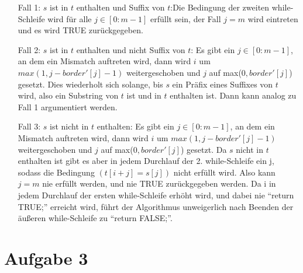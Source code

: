 \documentclass[a4paper,10pt,oneside,leqno]{scrartcl}
\begin{document}
\begin{itemize}
  \item[Fall 1:] $s$ ist in $t$ enthalten und Suffix von $t$:\newline Die Bedingung der zweiten while-Schleife wird für alle $j\in [0:m-1]$ erfüllt sein,
  der Fall $j=m$ wird eintreten und es wird TRUE zurückgegeben.
  \item[Fall 2:] $s$ ist in $t$ enthalten und nicht Suffix von $t$: Es gibt ein $j\in [0:m-1]$, an dem ein Mismatch auftreten wird, dann wird $i$ um
  $max(1,j-border'[j]-1)$ weitergeschoben und $j$ auf max($0,border'[j]$) gesetzt. Dies wiederholt sich solange, bis $s$ ein Präfix eines Suffixes von $t$ wird,
  also ein Substring von $t$ ist und in $t$ enthalten ist. Dann kann analog zu Fall 1 argumentiert werden.
  \item[Fall 3:] $s$ ist nicht in $t$ enthalten: Es gibt ein $j\in [0:m-1]$, an dem ein Mismatch auftreten wird, dann wird $i$ um
  $max(1,j-border'[j]-1)$ weitergeschoben und $j$ auf max($0,border'[j]$) gesetzt. Da $s$ nicht in $t$ enthalten ist gibt es aber in jedem Durchlauf der 2. while-Schleife ein j,
  sodass die Bedingung $(t[i + j] = s[j])$ nicht erfüllt wird. Also kann $j=m$ nie erfüllt werden, und nie TRUE zurückgegeben werden. Da i in jedem Durchlauf
  der ersten while-Schleife erhöht wird, und dabei nie ``return TRUE;'' erreicht wird, führt der Algorithmus unweigerlich nach Beenden der äußeren while-Schleife zu
  ``return FALSE;''.
\end{itemize}

\section*{Aufgabe 3}
\end{document}
